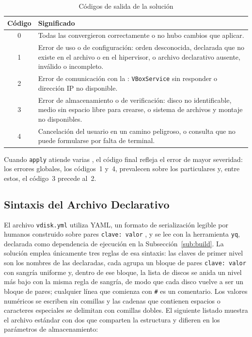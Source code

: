 \begin{table}[H]
    \centering
    \caption{Códigos de salida de la solución}
    \label{tab:codigos}
    \begin{tabular}{@{}cp{11.6cm}@{}}
        \toprule
        \textbf{Código} & \textbf{Significado} \\
        \midrule
        0 & Todas las \vm{} convergieron correctamente o no hubo cambios que aplicar. \\
        1 & Error de uso o de configuración: orden desconocida, \vm{} declarada que no existe en el archivo o en el hipervisor, o archivo declarativo ausente, inválido o incompleto. \\
        2 & Error de comunicación con la \vm{}: \texttt{VBoxService} sin responder o dirección IP no disponible. \\
        3 & Error de almacenamiento o de verificación: disco no identificable, medio sin espacio libre para crearse, o sistema de archivos y montaje no disponibles. \\
        4 & Cancelación del usuario en un camino peligroso, o consulta que no puede formularse por falta de terminal. \\
        \bottomrule
    \end{tabular}
\end{table}

Cuando \texttt{apply} atiende varias \vm{}, el código final refleja el error de mayor severidad: los errores globales, los códigos~1 y~4, prevalecen sobre los particulares y, entre estos, el código~3 precede al~2.

\subsection{Sintaxis del Archivo Declarativo}
\label{sub:yml}

El archivo \texttt{vdisk.yml} utiliza YAML, un formato de serialización legible por humanos construido sobre pares \texttt{clave: valor} \parencite{yaml_spec}, y se lee con la herramienta \texttt{yq}, declarada como dependencia de ejecución en la Subsección~\ref{sub:build}. La solución emplea únicamente tres reglas de esa sintaxis: las claves de primer nivel son los nombres de las \vm{} declaradas, cada \vm{} agrupa un bloque de pares \texttt{clave: valor} con sangría uniforme y, dentro de ese bloque, la lista de discos se anida un nivel más bajo con la misma regla de sangría, de modo que cada disco vuelve a ser un bloque de pares; cualquier línea que comienza con \texttt{\#} es un comentario. Los valores numéricos se escriben sin comillas y las cadenas que contienen espacios o caracteres especiales se delimitan con comillas dobles. El siguiente listado muestra el archivo estándar con dos \vm{} que comparten la estructura y difieren en los parámetros de almacenamiento:

